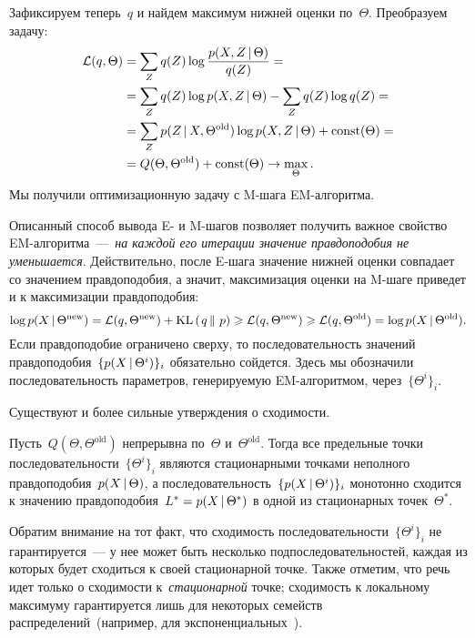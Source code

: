 \documentclass[12pt,fleqn]{article}
\begin{document}
Зафиксируем теперь~$q$ и найдем максимум нижней оценки по~$\Theta$.
Преобразуем задачу:
\begin{align*}
    \mathcal{L}(q, \Theta)
    &=
    \sum_Z
        q(Z)
        \log \frac{
            p(X, Z \mspace{3mu}{|}\mspace{3mu} \Theta)
        }{
            q(Z)
        }
    =\\
    &=
    \sum_Z
        q(Z)
        \log p(X, Z \mspace{3mu}{|}\mspace{3mu} \Theta)
    -
    \sum_Z
        q(Z)
        \log q(Z)
    =\\
    &=
    \sum_Z
        p(Z \mspace{3mu}{|}\mspace{3mu} X, \Theta^\text{old})
        \log p(X, Z \mspace{3mu}{|}\mspace{3mu} \Theta)
    +
    \text{const}(\Theta)
    =\\
    &=
    Q(\Theta, \Theta^\text{old})
    +
    \text{const}(\Theta)
    \to
    \max_\Theta.
\end{align*}
Мы получили оптимизационную задачу с M-шага EM-алгоритма.

Описанный способ вывода E- и M-шагов позволяет получить
важное свойство EM-алгоритма~---~\emph{на каждой его итерации
значение правдоподобия не уменьшается}.
Действительно, после E-шага значение нижней оценки совпадает
со значением правдоподобия, а значит, максимизация
оценки на M-шаге приведет и к максимизации правдоподобия:
\[
    \log p(X \mspace{3mu}{|}\mspace{3mu} \Theta^\text{new})
    =
    \mathcal{L}(q, \Theta^\text{new})
    +
    \text{KL} \left(\left. {q} \mspace{3mu} \right\| \mspace{3mu} {p} \right)
    \geqslant
    \mathcal{L}(q, \Theta^\text{new})
    \geqslant
    \mathcal{L}(q, \Theta^\text{old})
    =
    \log p(X \mspace{3mu}{|}\mspace{3mu} \Theta^\text{old}).
\]
Если правдоподобие ограничено сверху,
то последовательность значений правдоподобия~$\{p(X \mspace{3mu}{|}\mspace{3mu} \Theta^i)\}_i$
обязательно сойдется.
Здесь мы обозначили последовательность параметров, генерируемую EM-алгоритмом,
через~$\{\Theta^i\}_i$.

Существуют и более сильные утверждения о сходимости.
\begin{vkTheorem}
    Пусть~$Q(\Theta, \Theta^\text{old})$ непрерывна по~$\Theta$ и~$\Theta^\text{old}$.
    Тогда все предельные точки последовательности~$\{\Theta^i\}_i$
    являются стационарными точками неполного правдоподобия~$p(X \mspace{3mu}{|}\mspace{3mu} \Theta)$,
    а последовательность~$\{p(X \mspace{3mu}{|}\mspace{3mu} \Theta^i)\}_i$ монотонно сходится
    к значению правдоподобия~$L^* = p(X \mspace{3mu}{|}\mspace{3mu} \Theta^*)$
    в одной из стационарных точек~$\Theta^*$.
\end{vkTheorem}
Обратим внимание на тот факт, что сходимость последовательности~$\{\Theta^i\}_i$
не гарантируется~--- у нее может быть несколько подпоследовательностей,
каждая из которых будет сходиться к своей стационарной точке.
Также отметим, что речь идет только о сходимости к~\emph{стационарной} точке;
сходимость к локальному максимуму гарантируется лишь для
некоторых семейств распределений~(например, для экспоненциальных~\cite{wu83convergence}).
\end{document}
